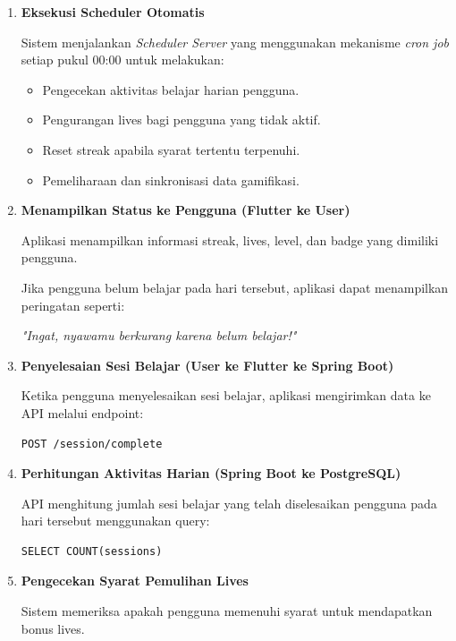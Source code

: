 \documentclass[11pt]{article}
\begin{document}
\begin{enumerate}
\begin{itemize}
\end{itemize}

\item \textbf{Eksekusi Scheduler Otomatis}

Sistem menjalankan \textit{Scheduler Server} yang menggunakan mekanisme \textit{cron job} setiap pukul 00:00 untuk melakukan:

\begin{itemize}
\item Pengecekan aktivitas belajar harian pengguna.
\item Pengurangan lives bagi pengguna yang tidak aktif.
\item Reset streak apabila syarat tertentu terpenuhi.
\item Pemeliharaan dan sinkronisasi data gamifikasi.
\end{itemize}

\item \textbf{Menampilkan Status ke Pengguna (Flutter ke User)}

Aplikasi menampilkan informasi streak, lives, level, dan badge yang dimiliki pengguna.

Jika pengguna belum belajar pada hari tersebut, aplikasi dapat menampilkan peringatan seperti:

\textit{"Ingat, nyawamu berkurang karena belum belajar!"}

\item \textbf{Penyelesaian Sesi Belajar (User ke Flutter ke Spring Boot)}

Ketika pengguna menyelesaikan sesi belajar, aplikasi mengirimkan data ke API melalui endpoint:

\begin{verbatim}
POST /session/complete
\end{verbatim}

\item \textbf{Perhitungan Aktivitas Harian (Spring Boot ke PostgreSQL)}

API menghitung jumlah sesi belajar yang telah diselesaikan pengguna pada hari tersebut menggunakan query:

\begin{verbatim}
SELECT COUNT(sessions)
\end{verbatim}

\item \textbf{Pengecekan Syarat Pemulihan Lives}

Sistem memeriksa apakah pengguna memenuhi syarat untuk mendapatkan bonus lives.


\end{enumerate}
\end{document}
